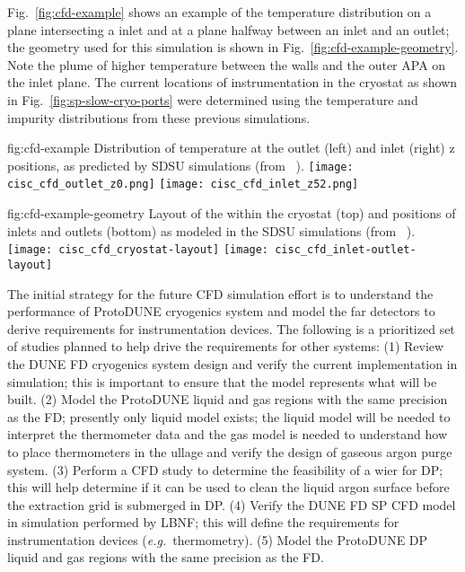 Fig.\ \ref{fig:cfd-example} shows an example of the temperature
distribution on a plane intersecting a  inlet and at a
plane halfway between an inlet and an outlet; the geometry used for
this simulation is shown in Fig.\ \ref{fig:cfd-example-geometry}.
Note the plume of higher temperature  between the walls and
the outer APA on the inlet plane.  The current locations of instrumentation in
the cryostat as shown in Fig.\ \ref{fig:sp-slow-cryo-ports} were
determined using the temperature and impurity distributions from these
previous simulations.

\begin{dunefigure}{fig:cfd-example}
  {Distribution of temperature at the outlet (left) and inlet (right) z positions, as predicted by SDSU  simulations (from ~\cite{docdb-5915}). }
  \texttt{[image: cisc\_cfd\_outlet\_z0.png]}
  \texttt{[image: cisc\_cfd\_inlet\_z52.png]}
\end{dunefigure}

\begin{dunefigure}{fig:cfd-example-geometry}
  {Layout of the  within the cryostat (top) and positions of
     inlets and outlets (bottom) as modeled in the SDSU
     simulations (from ~\cite{docdb-5915}).}
  \texttt{[image: cisc\_cfd\_cryostat-layout]}
  \texttt{[image: cisc\_cfd\_inlet-outlet-layout]}
\end{dunefigure}

The initial strategy for the future CFD simulation effort is to understand the performance of ProtoDUNE cryogenics system and model the far detectors to derive requirements for instrumentation devices.
The following is a prioritized set of studies planned to help drive the requirements for other systems:
(1) Review the DUNE FD cryogenics system design and verify the current implementation in simulation; this is important to ensure that the model represents what will be built.
(2) Model the ProtoDUNE liquid and gas regions with the same precision as the FD; presently only liquid model exists; the liquid model will be needed to interpret the thermometer data and the gas model is needed to understand how to place thermometers in the ullage and verify the design of gaseous argon purge system.
(3) Perform a CFD study to determine the feasibility of a wier for DP; this will help determine if it can be used to clean the liquid argon surface before the extraction grid is submerged in DP.
(4) Verify the DUNE FD SP CFD model in simulation performed by LBNF; this will define the requirements for instrumentation devices ({\em e.g.}\ thermometry).
(5) Model the ProtoDUNE DP liquid and gas regions with the same precision as the FD.
